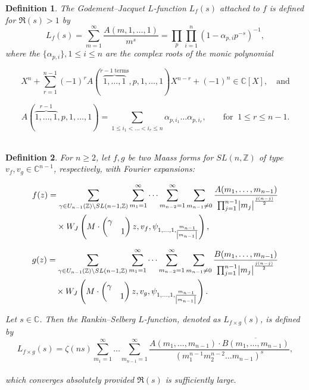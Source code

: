 \documentclass[sn-mathphys,Numbered]{sn-jnl}
\theoremstyle{thmstyleone}%
\theoremstyle{thmstyletwo}%
\theoremstyle{thmstylethree}%
\newtheorem{definition}{Definition}%
\begin{document}
\begin{definition} \cite{YjGl}
The Godement--Jacquet $L$-function $L_f(s)$ attached to $f$ is defined for $\Re(s) >1$ by 
$$ L_f(s) = \sum_{m=1}^{\infty} \frac{A(m,1,\dots,1)}{m^s} = \prod_p \prod_{i=1}^n (1-\alpha_{p,i}p^{-s})^{-1} ,$$ 
where the $\{ \alpha_{p,i} \}, 1\leq i \leq n$ are the complex roots of the monic polynomial 

$$ X^n + \sum_{r=1}^{n-1} (-1)^r A(\overbrace{1,\dots,1}^{r-1 \; \text{terms}},p,1,\dots,1) X^{n-r} +(-1)^n \in \mathbb{C}[X], \quad \text{and}$$

$$ A(\overbrace{1,\dots,1}^{r-1},p,1,\dots,1) = \sum_{1 \leq i_1 < \dots < i_r \leq n} \alpha_{p,i_1} \dots \alpha_{p,i_r}, \qquad \text{for} \; \; 1 \leq r \leq n-1  .$$ \\
\end{definition}



\begin{definition} \cite{Dg}
For $n \geq 2$, let $f,g$ be two Maass forms for $SL(n,\mathbb{Z})$ of type $v_f,v_g \in \mathbb{C}^{n-1}$, respectively, with Fourier expansions:

\begin{align*}
f(z) &= \sum_{\gamma \in U_{n-1}(\mathbb{Z}) \backslash SL(n-1,\mathbb{Z})} \sum_{m_1=1}^{\infty} \dots \sum_{m_{n-2}=1}^{\infty} \sum_{m_{n-1} \neq 0} \frac{A(m_1,\dots,m_{n-1})}{\prod_{j=1}^{n-1} \abs{m_j}^\frac{j(n-j)}{2}} \\
& \quad \times W_J \left( M \cdot \begin{pmatrix} \gamma &  \\  & 1 \end{pmatrix} z, v_f, \psi_{1,\dots,1,\frac{m_{n-1}}{\abs{m_{n-1}}}}\right) ,
\end{align*}

\begin{align*}
g(z) &= \sum_{\gamma \in U_{n-1}(\mathbb{Z}) \backslash SL(n-1,\mathbb{Z})} \sum_{m_1=1}^{\infty} \dots \sum_{m_{n-2}=1}^{\infty} \sum_{m_{n-1} \neq 0} \frac{B(m_1,\dots,m_{n-1})}{\prod_{j=1}^{n-1} \abs{m_j}^\frac{j(n-j)}{2}} \\
& \quad \times W_J \left( M \cdot \begin{pmatrix} \gamma &  \\  & 1 \end{pmatrix} z, v_g, \psi_{1,\dots,1,\frac{m_{n-1}}{\abs{m_{n-1}}}}\right). 
\end{align*}

\noindent
Let $s \in \mathbb{C}$. Then the Rankin--Selberg $L$-function, denoted as $L_{f\times g}(s)$, is defined by
$$ L_{f\times g}(s) = \zeta(ns) \sum_{m_1=1}^{\infty} \dots \sum_{m_{n-1}=1}^{\infty} \frac{A(m_1,\dots,m_{n-1}) \cdot \overline{B(m_1,\dots,m_{n-1})}}{(m_1^{n-1} m_2^{n-2} \dots m_{n-1})^s},$$ \\
which converges absolutely provided $\Re(s)$ is sufficiently large. \\
\end{definition} 
\end{document}
